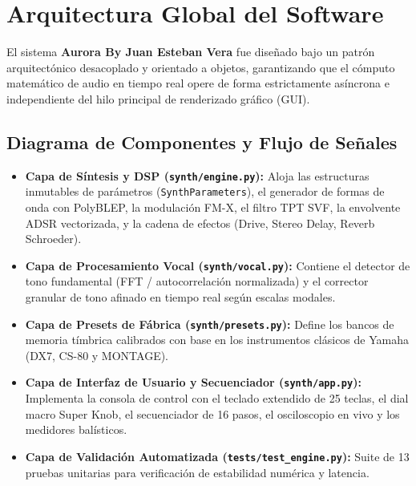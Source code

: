 \documentclass[11pt,a4paper]{article}
\begin{document}
\newpage
\tableofcontents
\newpage

\section{Arquitectura Global del Software}

El sistema \textbf{Aurora By Juan Esteban Vera} fue diseñado bajo un patrón arquitectónico desacoplado y orientado a objetos, garantizando que el cómputo matemático de audio en tiempo real opere de forma estrictamente asíncrona e independiente del hilo principal de renderizado gráfico (GUI).

\subsection{Diagrama de Componentes y Flujo de Señales}
\begin{itemize}[leftmargin=1.5cm]
    \item \textbf{Capa de Síntesis y DSP (\texttt{synth/engine.py}):}
    Aloja las estructuras inmutables de parámetros (\texttt{SynthParameters}), el generador de formas de onda con PolyBLEP, la modulación FM-X, el filtro TPT SVF, la envolvente ADSR vectorizada, y la cadena de efectos (Drive, Stereo Delay, Reverb Schroeder).
    \item \textbf{Capa de Procesamiento Vocal (\texttt{synth/vocal.py}):}
    Contiene el detector de tono fundamental (FFT / autocorrelación normalizada) y el corrector granular de tono afinado en tiempo real según escalas modales.
    \item \textbf{Capa de Presets de Fábrica (\texttt{synth/presets.py}):}
    Define los bancos de memoria tímbrica calibrados con base en los instrumentos clásicos de Yamaha (DX7, CS-80 y MONTAGE).
    \item \textbf{Capa de Interfaz de Usuario y Secuenciador (\texttt{synth/app.py}):}
    Implementa la consola de control con el teclado extendido de 25 teclas, el dial macro Super Knob, el secuenciador de 16 pasos, el osciloscopio en vivo y los medidores balísticos.
    \item \textbf{Capa de Validación Automatizada (\texttt{tests/test\_engine.py}):}
    Suite de 13 pruebas unitarias para verificación de estabilidad numérica y latencia.
\end{itemize}

\end{document}
